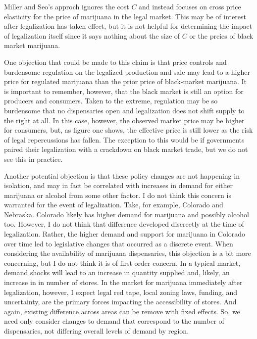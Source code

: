 \documentclass[11pt]{article}
\begin{document}
Miller and Seo's approch ignores the cost $C$ and instead focuses on cross price elasticity for the price of marijuana in the legal market. This may be of interest after legalization has taken effect, but it is not helpful for determining the impact of legalization itself since it says nothing about the size of $C$ or the prcies of black market marijuana. \par


One objection that could be made to this claim is that price controls and burdensome regulation on the legalized production and sale may lead to a higher price for regulated marijuana than the prior price of black-market marijuana. It is important to remember, however, that the black market is still an option for producers and consumers. Taken to the extreme, regulation may be so burdensome that no dispensaries open and legalization does not shift supply to the right at all. In this case, however, the observed market price may be higher for consumers, but, as figure one shows, the effective price is still lower as the risk of legal repercussions has fallen. The exception to this would be if governments paired their legalization with a crackdown on black market trade, but we do not see this in practice. \par

Another potential objection is that these policy changes are not happening in isolation, and may in fact be correlated with increases in demand for either marijuana or alcohol from some other factor. I do not think this concern is warranted for the event of legalization. Take, for example, Colorado and Nebraska. Colorado likely has higher demand for marijuana and possibly alcohol too. However, I do not think that difference developed discreetly at the time of legalization. Rather, the higher demand and support for marijuana in Colorado over time led to legislative changes that occurred as a discrete event. When considering the availability of marijuana dispensaries, this objection is a bit more concerning, but I do not think it is of first order concern. In a typical market, demand shocks will lead to an increase in quantity supplied and, likely, an increase in in number of stores. In the market for marijuana immediately after legalization, however, I expect legal red tape, local zoning laws, funding, and uncertainty, are the primary forces impacting the accessibility of stores. And again, existing difference across areas can be remove with fixed effects. So, we need only consider changes to demand that correspond to the number of dispensaries, not differing overall levels of demand by region. \par
\end{document}
